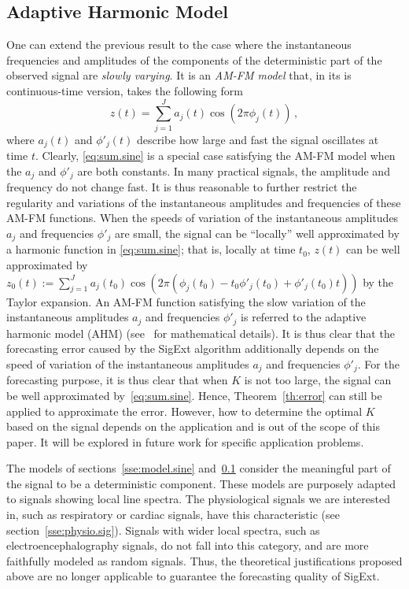 \subsection{Adaptive Harmonic Model}
\label{RemarkAHM}

One can extend the previous result to the case where the instantaneous frequencies and amplitudes of the components of the deterministic part of the observed signal are {\em slowly varying}. It is an \textit{AM-FM model} that, in its is continuous-time version, takes the following form
\begin{equation}
z(t) = \sum_{j=1}^J a_j(t)\cos(2\pi\phi_j(t))\,,
\end{equation}
where $a_j(t)$ and $\phi'_j(t)$ describe how large and fast the signal oscillates at time $t$. 
Clearly, \eqref{eq:sum.sine} is a special case satisfying the AM-FM model when the $a_j$ and $\phi'_j$ are both constants. 
%
In many practical signals, the amplitude and frequency do not change fast. It is thus reasonable to further restrict the regularity and variations of the instantaneous amplitudes and frequencies of these AM-FM functions. When the speeds of variation of the instantaneous amplitudes $a_j$ and frequencies $\phi'_j$ are small, the signal can be ``locally'' well approximated by a harmonic function in \eqref{eq:sum.sine}; that is, 
%
locally at time $t_0$, $z(t)$ can be well approximated by $z_0(t) := \sum_{j=1}^J a_j(t_0)\cos(2\pi(\phi_j(t_0)-t_0\phi'_j(t_0)+\phi'_j(t_0)t))$ by the Taylor expansion. An AM-FM function satisfying the slow variation of the instantaneous amplitudes $a_j$ and frequencies $\phi'_j$ is referred to the adaptive harmonic model (AHM) (see~\cite{Chen14nonparametric,Daubechies16conceft} for mathematical details).
It is thus clear that the forecasting error caused by the {\sf SigExt} algorithm additionally depends on the speed of variation of the instantaneous amplitudes $a_j$ and frequencies $\phi'_j$. 
%
For the forecasting purpose, it is thus clear that when $K$ is not too large, the signal can be well approximated by~\eqref{eq:sum.sine}. Hence, Theorem~\ref{th:error} can still be applied to approximate the error. However, how to determine the optimal $K$ based on the signal depends on the application and is out of the scope of this paper. It will be explored in future work for specific application problems.

{\color{red}
The models of sections~\ref{sse:model.sine} and~\ref{RemarkAHM} consider the meaningful part of the signal to be a deterministic component. These models are purposely adapted to signals showing local line spectra. The physiological signals we are interested in, such as respiratory or cardiac signals, have this characteristic (see section~\ref{sse:physio.sig}). Signals with wider local spectra, such as electroencephalography signals, do not fall into this category, and are more faithfully modeled as random signals. Thus, the theoretical justifications proposed above are no longer applicable to guarantee the forecasting quality of {\sf SigExt}.
}

